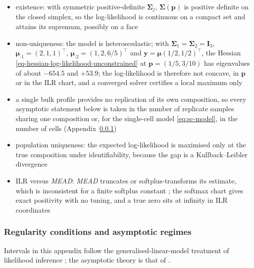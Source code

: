 \begin{itemize}
  \item existence: with symmetric positive-definite \(\boldsymbol{\Sigma}_{j}\), \(\boldsymbol{\Sigma}(\boldsymbol{p})\) is positive definite
        on the closed simplex, so the log-likelihood is continuous on a compact set and attains its supremum,
        possibly on a face
  \item non-uniqueness: the model is heteroscedastic; with \(\boldsymbol{\Sigma}_{1}=\boldsymbol{\Sigma}_{2}=\mathbf{I}_{3}\),
        \(\boldsymbol{\mu}_{\cdot1}=(2,1,1)^{\top}\), \(\boldsymbol{\mu}_{\cdot2}=(1,2,6/5)^{\top}\) and \(\boldsymbol{y}=\boldsymbol{\mu}(1/2,1/2)^{\top}\), the
        Hessian \eqref{eq-hessian-log-likelihood-unconstrained} at \(\boldsymbol{p}=(1/5,3/10)\) has eigenvalues of about
        \(-654.5\) and \(+53.9\); the log-likelihood is therefore not concave, in \(\boldsymbol{p}\) or in the ILR
        chart, and a converged solver certifies a local maximum only
  \item a single bulk profile provides no replication of its own composition, so every asymptotic
        statement below is taken in the number of replicate samples sharing one composition or, for the
        single-cell model \eqref{eq:sc-model}, in the number of cells (Appendix~\ref{app:mle-regularity})
  \item population uniqueness: the expected log-likelihood is maximised only at the true composition under
        identifiability, because the gap is a Kullback--Leibler divergence \cite{vaartAsymptoticStatistics2000}
  \item ILR versus \emph{MEAD}: \emph{MEAD} truncates or softplus-transforms its estimate, which is inconsistent for a
        finite softplus constant \cite{xieStatisticalInferenceCell2026}; the softmax chart gives exact positivity with
        no tuning, and a true zero sits at infinity in ILR coordinates
\end{itemize}

\subsubsection{Regularity conditions and asymptotic regimes}
\label{app:mle-regularity}

Intervals in this appendix follow the generalised-linear-model treatment of likelihood inference
\cite[Sects.~4.2--4.3]{agrestiFoundationsLinearGeneralized2015}; the asymptotic theory is that of
\cite[Ch.~9]{coxTheoreticalStatistics1979}.

